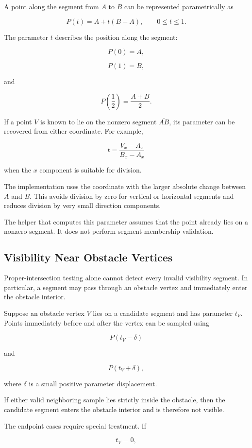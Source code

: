 A point along the segment from $A$ to $B$ can be represented parametrically
as

\[
P(t) = A + t(B-A),
\qquad 0 \leq t \leq 1.
\]

The parameter $t$ describes the position along the segment:

\[
P(0)=A,
\]

\[
P(1)=B,
\]

and

\[
P\left(\frac{1}{2}\right)
=
\frac{A+B}{2}.
\]

If a point $V$ is known to lie on the nonzero segment $\overline{AB}$, its
parameter can be recovered from either coordinate. For example,

\[
t = \frac{V_x-A_x}{B_x-A_x}
\]

when the $x$ component is suitable for division.

The implementation uses the coordinate with the larger absolute change
between $A$ and $B$. This avoids division by zero for vertical or horizontal
segments and reduces division by very small direction components.

The helper that computes this parameter assumes that the point already lies
on a nonzero segment. It does not perform segment-membership validation.

\subsection{Visibility Near Obstacle Vertices}

Proper-intersection testing alone cannot detect every invalid visibility
segment. In particular, a segment may pass through an obstacle vertex and
immediately enter the obstacle interior.

Suppose an obstacle vertex $V$ lies on a candidate segment and has parameter
$t_V$. Points immediately before and after the vertex can be sampled using

\[
P(t_V-\delta)
\]

and

\[
P(t_V+\delta),
\]

where $\delta$ is a small positive parameter displacement.

If either valid neighboring sample lies strictly inside the obstacle, then the
candidate segment enters the obstacle interior and is therefore not visible.

The endpoint cases require special treatment. If

\[
t_V=0,
\]

